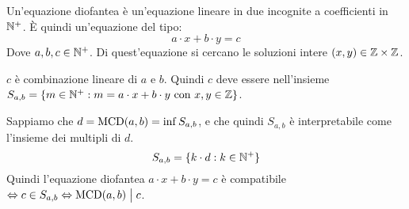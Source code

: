 \begin{defn}
Un'equazione diofantea \`e un'equazione lineare in due incognite a coefficienti in $\mathbb{N}^+$. \`E quindi un'equazione del tipo:
\[
a \cdot x + b \cdot y = c
\]
Dove $a, b, c \in \mathbb{N}^+$. Di quest'equazione si cercano le soluzioni intere $(x, y) \in \mathbb{Z} \times \mathbb{Z}$.
\end{defn}
$c$ \`e combinazione lineare di $a$ e $b$. Quindi $c$ deve essere nell'insieme $S_{a,b} = \{ m \in \mathbb{N}^+ : m = a \cdot x + b \cdot y \text{ con } x, y \in \mathbb{Z}\}$.

Sappiamo che $d = \operatorname{MCD}(a,b) = \inf S_{a,b}$, e che quindi $S_{a,b}$ \`e interpretabile come l'insieme dei multipli di $d$.
\[
S_{a,b} = \{ k \cdot d : k \in \mathbb{N}^+ \}
\]
Quindi l'equazione diofantea $a \cdot x + b \cdot y = c$ \`e compatibile $\Leftrightarrow c \in S_{a,b} \Leftrightarrow \operatorname{MCD}(a,b) \bigm| c$.

